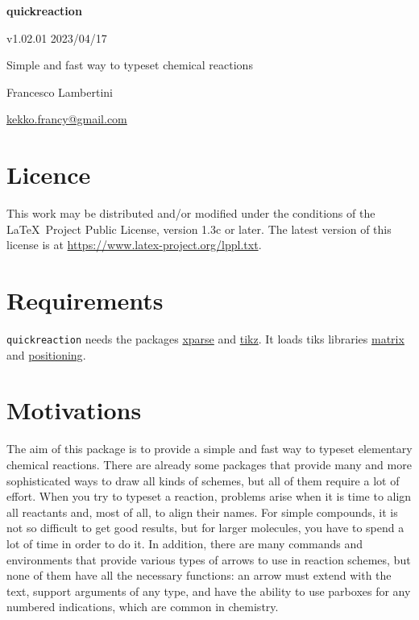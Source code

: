 \documentclass{scrarticle}
\begin{document}
\begin{center}
\textbf{\Huge quickreaction} 

\vspace{0.5cm}

v1.02.01 \hspace{1cm} 2023/04/17

\vspace{0.5cm}

Simple and fast way to typeset chemical reactions
 
 \vspace{0.5cm}

Francesco Lambertini

\vspace{0.5cm}

\href{mailto: kekko.francy@gmail.com}{kekko.francy@gmail.com}
\end{center}


\tableofcontents

\section{Licence}
This work may be distributed and/or modified under the conditions of the \LaTeX~Project Public License, version 1.3c or later. The latest version of this license is at \url{https://www.latex-project.org/lppl.txt}.

\section{Requirements}
\lstinline{quickreaction} needs the packages \href{https://ctan.org/pkg/xparse}{\ttfamily xparse} and \href{https://ctan.org/pkg/tikz-page}{\ttfamily tikz}. It loads tiks libraries \href{https://tikz.dev/library-matrix}{\ttfamily matrix} and \href{https://tikz.dev/tikz-shapes#sec-17.5}{\ttfamily positioning}.

\section{Motivations}
The aim of this package is to provide a simple and fast way to typeset elementary chemical reactions. There are already some packages that provide many and more sophisticated ways to draw all kinds of schemes, but all of them require a lot of effort. When you try to typeset a reaction, problems arise when it is time to align all reactants and, most of all, to align their names. For simple compounds, it is not so difficult to get good results, but for larger molecules, you have to spend a lot of time in order to do it. In addition, there are many commands and environments that provide various types of arrows to use in reaction schemes, but none of them have all the necessary functions: an arrow must extend with the text, support arguments of any type, and have the ability to use parboxes for any numbered indications, which are common in chemistry. 
\end{document}
